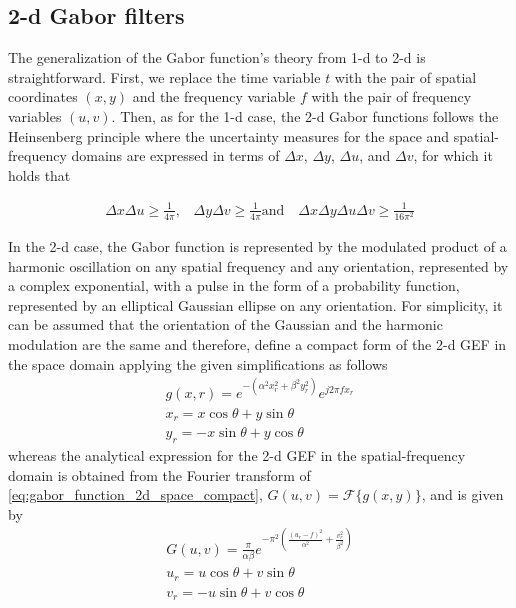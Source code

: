 \subsection{2-d Gabor filters}
The generalization of the Gabor function's theory from 1-d to 2-d is straightforward. First, we replace the time variable $t$ with the pair of spatial coordinates $(x, y)$ and the frequency variable $f$ with the pair of frequency variables $(u, v)$. Then, as for the 1-d case, the 2-d Gabor functions follows the Heinsenberg principle where the uncertainty measures for the space and spatial-frequency domains are expressed in terms of $\Delta x$, $\Delta y$, $\Delta u$, and $\Delta v$, for which it holds that

\begin{equation}\label{eq:uncertainty_principle_2d}
    \begin{gathered}
        \Delta x\Delta u \geq \frac{1}{4\pi}\textrm{,} \quad \Delta y\Delta v \geq \frac{1}{4\pi}\textrm{and} \quad \Delta x \Delta y \Delta u \Delta v \geq \frac{1}{16\pi^2}
    \end{gathered}
\end{equation}

In the 2-d case, the Gabor function is represented by the modulated product of a harmonic oscillation on any spatial frequency and any orientation, represented by a complex exponential, with a pulse in the form of a probability function, represented by an elliptical Gaussian ellipse on any orientation. For simplicity, it can be assumed that the orientation of the Gaussian and the harmonic modulation are the same and  therefore, define a compact form of the 2-d GEF in the space domain applying the given simplifications as follows
\begin{equation}\label{eq:gabor_function_2d_space_compact}
    \begin{gathered}
        g(x, r) =  e ^{-\left(\alpha^2 x_r^2 + \beta^2 y_r^2\right)} e ^{j 2 \pi f x_r } \\
        x_r = x \cos{\theta} + y \sin{\theta}\\
        y_r = -x \sin{\theta} + y \cos{\theta}
     \end{gathered}
\end{equation}
whereas the analytical expression for the 2-d GEF in the spatial-frequency domain is obtained from the Fourier transform of \eqref{eq:gabor_function_2d_space_compact}, $G(u, v) = \mathcal{F}\{g(x, y)\}$, and is given by 
\begin{equation}\label{eq:gabor_function_2d_frequency_compact}
    \begin{gathered}
        G(u, v) =  \frac{\pi}{\alpha \beta} e ^{- \pi^2 \left(\frac{\left( u_r - f\right)^2}{\alpha^2} + \frac{v_r^2}{\beta^2}\right)} \\
        u_r = u \cos{\theta} + v \sin{\theta}\\
        v_r = -u \sin{\theta} + v \cos{\theta}
     \end{gathered}
\end{equation}

